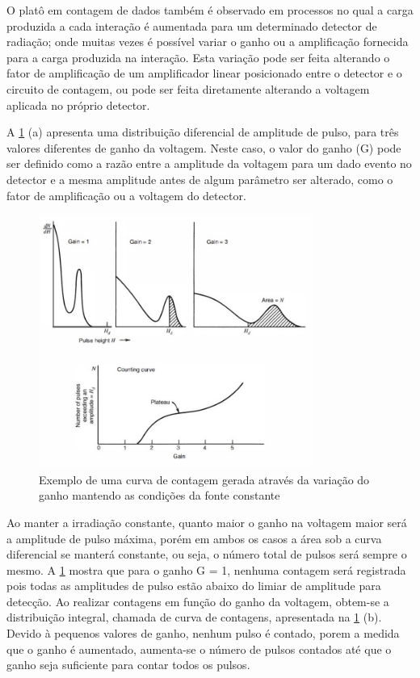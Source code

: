 \documentclass[11pt,a4paper]{article}
\begin{document}
	O platô em contagem de dados também é observado em processos no qual a carga produzida a cada interação é aumentada para um determinado detector de radiação; onde muitas vezes é possível variar o ganho ou a amplificação fornecida para a carga produzida na interação. Esta variação pode ser feita alterando o fator de amplificação de um amplificador linear posicionado entre o detector e o circuito de contagem, ou pode ser feita diretamente alterando a voltagem aplicada no próprio detector. 

	A  \ref{fig:curvaContagemGanho} (a) apresenta uma distribuição diferencial de amplitude de pulso, para três valores diferentes de ganho da voltagem. Neste caso, o valor do ganho (G) pode ser definido como a razão entre a amplitude da voltagem para um dado evento no detector e a mesma amplitude antes de algum parâmetro ser alterado, como o fator de amplificação ou a voltagem do detector. 

			\begin{figure}[h]
				\centering
				\includegraphics[width=0.8\textwidth]{Imagens/curvaContagemGanho.jpg}
				\caption{Exemplo de uma curva de contagem gerada através da variação do ganho mantendo as condições da fonte constante}
				\label{fig:curvaContagemGanho}
			\end{figure}

		
	Ao manter a irradiação constante, quanto maior o ganho na voltagem maior será a amplitude de pulso máxima, porém em ambos os casos a área sob a curva diferencial se manterá constante, ou seja, o número total de pulsos  será sempre o mesmo. A  \ref{fig:curvaContagemGanho} mostra que para o ganho G = 1, nenhuma contagem será registrada pois todas as amplitudes de pulso estão abaixo do limiar de amplitude para detecção. Ao realizar contagens em função do ganho da voltagem, obtem-se a distribuição integral, chamada de curva de contagens, apresentada na  \ref{fig:curvaContagemGanho} (b). Devido à pequenos valores de ganho, nenhum pulso é contado, porem a medida que o ganho é aumentado, aumenta-se o número de pulsos contados até que o ganho seja suficiente para contar todos os pulsos. 
\end{document}
